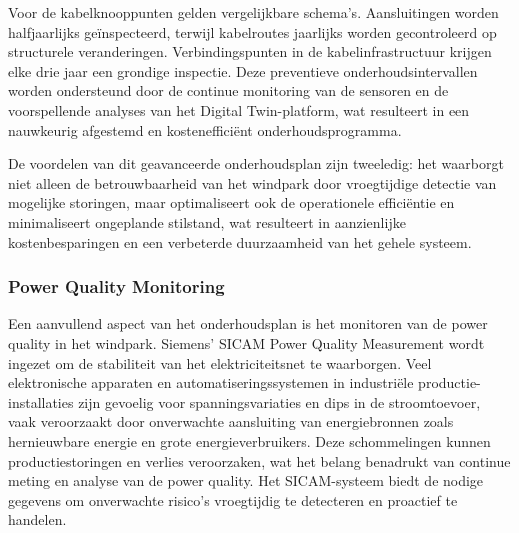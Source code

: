 Voor de kabelknooppunten gelden vergelijkbare schema's. Aansluitingen worden halfjaarlijks geïnspecteerd, terwijl kabelroutes jaarlijks worden gecontroleerd op structurele veranderingen. Verbindingspunten in de kabelinfrastructuur krijgen elke drie jaar een grondige inspectie. Deze preventieve onderhoudsintervallen worden ondersteund door de continue monitoring van de sensoren en de voorspellende analyses van het Digital Twin-platform, wat resulteert in een nauwkeurig afgestemd en kostenefficiënt onderhoudsprogramma.

De voordelen van dit geavanceerde onderhoudsplan zijn tweeledig: het waarborgt niet alleen de betrouwbaarheid van het windpark door vroegtijdige detectie van mogelijke storingen, maar optimaliseert ook de operationele efficiëntie en minimaliseert ongeplande stilstand, wat resulteert in aanzienlijke kostenbesparingen en een verbeterde duurzaamheid van het gehele systeem\cite{5460911,5256318,10269370}.

\subsubsection{Power Quality Monitoring}
Een aanvullend aspect van het onderhoudsplan is het monitoren van de power quality in het windpark. Siemens' SICAM Power Quality Measurement wordt ingezet om de stabiliteit van het elektriciteitsnet te waarborgen. Veel elektronische apparaten en automatiseringssystemen in industriële productie-installaties zijn gevoelig voor spanningsvariaties en dips in de stroomtoevoer, vaak veroorzaakt door onverwachte aansluiting van energiebronnen zoals hernieuwbare energie en grote energieverbruikers\cite{siemens-power-quality-measurement}. Deze schommelingen kunnen productiestoringen en verlies veroorzaken, wat het belang benadrukt van continue meting en analyse van de power quality. Het SICAM-systeem biedt de nodige gegevens om onverwachte risico's vroegtijdig te detecteren en proactief te handelen\cite{siemens-power-quality-measurement}.